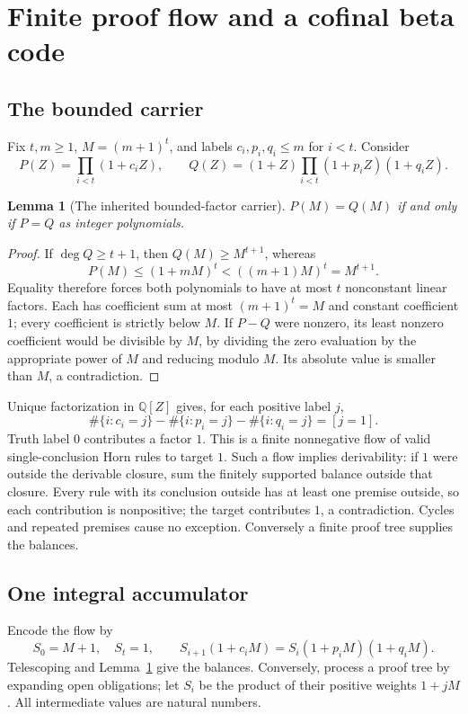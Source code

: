 \documentclass[11pt,letterpaper]{article}
\newcommand{\Q}{\mathbb Q}
\newtheorem{lemma}[theorem]{Lemma}
\theoremstyle{definition}\newtheorem{definition}[theorem]{Definition}
\theoremstyle{remark}\newtheorem{remark}[theorem]{Remark}
\begin{document}
\section{Finite proof flow and a cofinal beta code}

\subsection{The bounded carrier}

Fix $t,m\ge1$, $M=(m+1)^t$, and labels $c_i,p_i,q_i\le m$ for $i<t$.
Consider
\[
 P(Z)=\prod_{i<t}(1+c_iZ),\qquad
 Q(Z)=(1+Z)\prod_{i<t}(1+p_iZ)(1+q_iZ).
\]
\begin{lemma}[The inherited bounded-factor carrier]\label{lem:carrier}
$P(M)=Q(M)$ if and only if $P=Q$ as integer polynomials.
\end{lemma}
\begin{proof}
If $\deg Q\ge t+1$, then $Q(M)\ge M^{t+1}$, whereas
\[
 P(M)\le(1+mM)^t<((m+1)M)^t=M^{t+1}.
\]
Equality therefore forces both polynomials to have at most $t$ nonconstant
linear factors. Each has coefficient sum at most $(m+1)^t=M$ and
constant coefficient $1$; every coefficient is strictly below $M$.
If $P-Q$ were nonzero, its least nonzero coefficient would be divisible
by $M$, by dividing the zero evaluation by the appropriate power of $M$
and reducing modulo $M$. Its absolute value is smaller than $M$,
a contradiction.
\end{proof}

Unique factorization in $\Q[Z]$ gives, for each positive label $j$,
\[
 \#\{i:c_i=j\}-\#\{i:p_i=j\}-\#\{i:q_i=j\}=[j=1].
\]
Truth label $0$ contributes a factor $1$. This is a finite nonnegative
flow of valid single-conclusion Horn rules to target $1$.
Such a flow implies derivability: if $1$ were outside the derivable
closure, sum the finitely supported balance outside that closure.
Every rule with its conclusion outside has at least one premise outside,
so each contribution is nonpositive; the target contributes $1$,
a contradiction. Cycles and repeated premises cause no exception.
Conversely a finite proof tree supplies the balances.

\subsection{One integral accumulator}

Encode the flow by
\[
 S_0=M+1,\quad S_t=1,\qquad
 S_{i+1}(1+c_iM)=S_i(1+p_iM)(1+q_iM).
\]
Telescoping and Lemma~\ref{lem:carrier} give the balances. Conversely,
process a proof tree by expanding open obligations; let $S_i$ be the
product of their positive weights $1+jM$. All intermediate values are
natural numbers.
\end{document}
